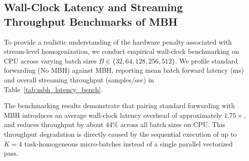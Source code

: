 \subsection{Wall-Clock Latency and Streaming Throughput Benchmarks of MBH}
\label{sec:mbh_benchmarks}
To provide a realistic understanding of the hardware penalty associated with stream-level homogenization, we conduct empirical wall-clock benchmarking on CPU across varying batch sizes $B \in \{32, 64, 128, 256, 512\}$. We profile standard forwarding (No MBH) against MBH, reporting mean batch forward latency (ms) and overall streaming throughput (samples/sec) in Table~\ref{tab:mbh_latency_bench}.

\begin{table}[h]
\caption{Empirical latency and throughput benchmarking of Micro-Batch Homogenization (MBH) on CPU.}
\label{tab:mbh_latency_bench}
\vskip 0.15in
\begin{center}
\begin{small}
\begin{sc}
\end{sc}
\end{small}
\end{center}
\vskip -0.1in
\end{table}

The benchmarking results demonstrate that pairing standard forwarding with MBH introduces an average wall-clock latency overhead of approximately \textbf{$1.75\times$}, and reduces throughput by about \textbf{$44\%$} across all batch sizes on CPU. This throughput degradation is directly caused by the sequential execution of up to $K=4$ task-homogeneous micro-batches instead of a single parallel vectorized pass.

